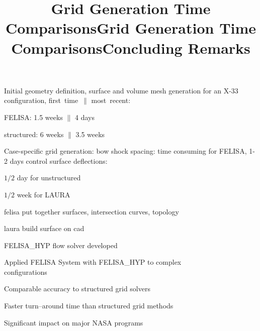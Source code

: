 \documentclass[landscape]{slides}
\begin{document}
\begin{slide}
  \title{Grid Generation Time Comparisons}
  \begin{items}
    \item Initial geometry definition, surface and volume mesh generation
          for an X-33 configuration, first~time~$\|$ most~recent:
          \begin{items}
            \item FELISA:  1.5 weeks $\|$ 4 days
            \item structured: 6 weeks $\|$ 3.5 weeks
          \end{items}
    \item Case-specific grid generation:
          bow shock spacing: time consuming for FELISA, 1-2 days
          control surface deflections:
          \begin{items}
            \item $1/2$ day for unstructured
            \item $1/2$ week for LAURA 
          \end{items}
  \end{items}
\end{slide}

\begin{note}
  \title{Grid Generation Time Comparisons}
  \begin{describe}[.9in]
    \item[felisa] put together surfaces, intersection curves, topology
    \item[laura] build surface on cad
  \end{describe}
\end{note}

\begin{slide}
  \title{Concluding Remarks}
  \begin{items}
    \item FELISA\_HYP flow solver  developed\\
    \item Applied FELISA System with FELISA\_HYP to complex \\configurations
          \begin{items}
            \item Comparable accuracy to structured grid solvers
            \item Faster turn--around time than structured grid methods
          \end{items}
    \item Significant impact on major NASA programs
  \end{items}
\end{slide}
\end{document}
